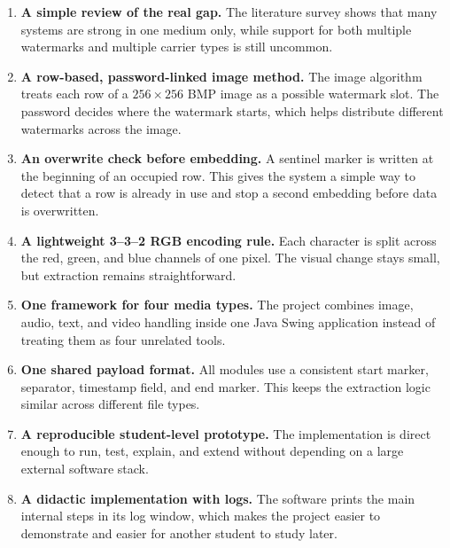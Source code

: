 \begin{enumerate}[label=\textbf{C\arabic*.}]
    \item \textbf{A simple review of the real gap.} The literature survey shows that many systems are strong in one medium only, while support for both multiple watermarks and multiple carrier types is still uncommon.
    \item \textbf{A row-based, password-linked image method.} The image algorithm treats each row of a $256 \times 256$ BMP image as a possible watermark slot. The password decides where the watermark starts, which helps distribute different watermarks across the image.
    \item \textbf{An overwrite check before embedding.} A sentinel marker is written at the beginning of an occupied row. This gives the system a simple way to detect that a row is already in use and stop a second embedding before data is overwritten.
    \item \textbf{A lightweight 3--3--2 RGB encoding rule.} Each character is split across the red, green, and blue channels of one pixel. The visual change stays small, but extraction remains straightforward.
    \item \textbf{One framework for four media types.} The project combines image, audio, text, and video handling inside one Java Swing application instead of treating them as four unrelated tools.
    \item \textbf{One shared payload format.} All modules use a consistent start marker, separator, timestamp field, and end marker. This keeps the extraction logic similar across different file types.
    \item \textbf{A reproducible student-level prototype.} The implementation is direct enough to run, test, explain, and extend without depending on a large external software stack.
    \item \textbf{A didactic implementation with logs.} The software prints the main internal steps in its log window, which makes the project easier to demonstrate and easier for another student to study later.
\end{enumerate}
